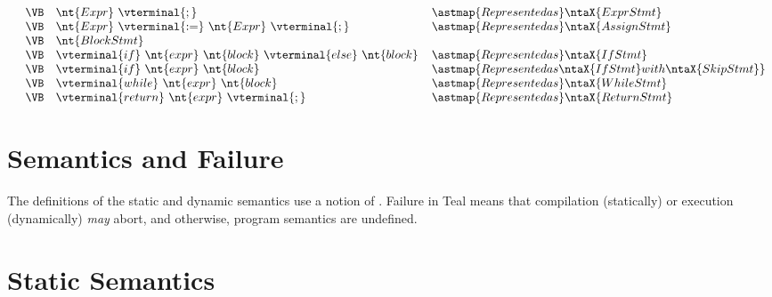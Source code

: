 \[\begin{array}[t]{lcl@{\hspace{0.4cm}}l}
               & \VB   & \nt{Expr}\ \vterminal{;} & \astmap{Represented as } \ntaX{ExprStmt}\\
               & \VB   & \nt{Expr}\ \vterminal{:=}\ \nt{Expr}\ \vterminal{;} & \astmap{Represented as } \ntaX{AssignStmt}\\
               & \VB   & \nt{BlockStmt} \\
               & \VB   & \vterminal{if}\ \nt{expr}\ \nt{block}\ \vterminal{else}\ \nt{block} & \astmap{Represented as } \ntaX{IfStmt}\\
               & \VB   & \vterminal{if}\ \nt{expr}\ \nt{block}\ & \astmap{Represented as \ntaX{IfStmt} with \ntaX{SkipStmt}} \\
               & \VB   & \vterminal{while}\ \nt{expr}\ \nt{block} & \astmap{Represented as } \ntaX{WhileStmt}\\
               & \VB   & \vterminal{return}\ \nt{expr}\ \vterminal{;} & \astmap{Represented as } \ntaX{ReturnStmt}\\
  \end{array}
\]

\section{Semantics and Failure}
The definitions of the static and dynamic semantics use a notion of
\emph{\failure{}}.  Failure in Teal means that compilation (statically)
or execution (dynamically) \emph{may} abort, and otherwise, program
semantics are undefined.

\section{Static Semantics}

